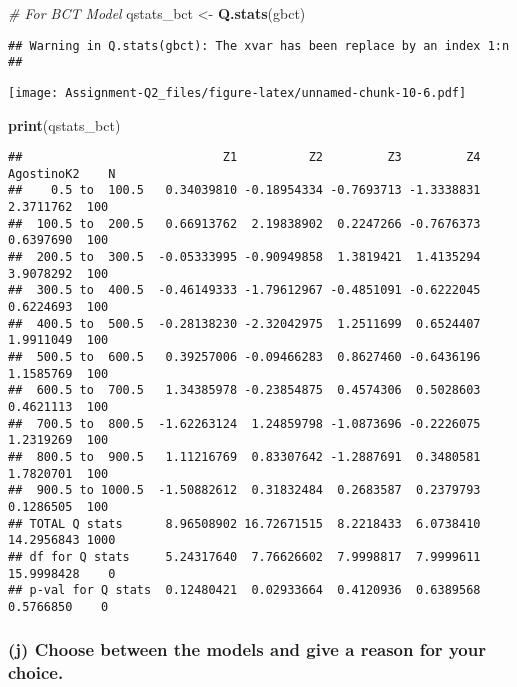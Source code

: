\documentclass[
]{article}
\newenvironment{Shaded}{\begin{snugshade}}{\end{snugshade}}
\newcommand{\CommentTok}[1]{\textcolor[rgb]{0.56,0.35,0.01}{\textit{#1}}}
\newcommand{\FunctionTok}[1]{\textcolor[rgb]{0.13,0.29,0.53}{\textbf{#1}}}
\newcommand{\NormalTok}[1]{#1}
\newcommand{\OtherTok}[1]{\textcolor[rgb]{0.56,0.35,0.01}{#1}}
\begin{document}
\begin{Shaded}
\begin{Highlighting}[]
\CommentTok{\# For BCT Model}
\NormalTok{qstats\_bct }\OtherTok{\textless{}{-}} \FunctionTok{Q.stats}\NormalTok{(gbct)}
\end{Highlighting}
\end{Shaded}

\begin{verbatim}
## Warning in Q.stats(gbct): The xvar has been replace by an index 1:n 
## 
\end{verbatim}

\texttt{[image: Assignment-Q2\_files/figure-latex/unnamed-chunk-10-6.pdf]}

\begin{Shaded}
\begin{Highlighting}[]
\FunctionTok{print}\NormalTok{(qstats\_bct)}
\end{Highlighting}
\end{Shaded}

\begin{verbatim}
##                            Z1          Z2         Z3         Z4 AgostinoK2    N
##    0.5 to  100.5   0.34039810 -0.18954334 -0.7693713 -1.3338831  2.3711762  100
##  100.5 to  200.5   0.66913762  2.19838902  0.2247266 -0.7676373  0.6397690  100
##  200.5 to  300.5  -0.05333995 -0.90949858  1.3819421  1.4135294  3.9078292  100
##  300.5 to  400.5  -0.46149333 -1.79612967 -0.4851091 -0.6222045  0.6224693  100
##  400.5 to  500.5  -0.28138230 -2.32042975  1.2511699  0.6524407  1.9911049  100
##  500.5 to  600.5   0.39257006 -0.09466283  0.8627460 -0.6436196  1.1585769  100
##  600.5 to  700.5   1.34385978 -0.23854875  0.4574306  0.5028603  0.4621113  100
##  700.5 to  800.5  -1.62263124  1.24859798 -1.0873696 -0.2226075  1.2319269  100
##  800.5 to  900.5   1.11216769  0.83307642 -1.2887691  0.3480581  1.7820701  100
##  900.5 to 1000.5  -1.50882612  0.31832484  0.2683587  0.2379793  0.1286505  100
## TOTAL Q stats      8.96508902 16.72671515  8.2218433  6.0738410 14.2956843 1000
## df for Q stats     5.24317640  7.76626602  7.9998817  7.9999611 15.9998428    0
## p-val for Q stats  0.12480421  0.02933664  0.4120936  0.6389568  0.5766850    0
\end{verbatim}

\hypertarget{j-choose-between-the-models-and-give-a-reason-for-your-choice.}{%
\subsubsection{(j) Choose between the models and give a reason for your
choice.}\label{j-choose-between-the-models-and-give-a-reason-for-your-choice.}}
\end{document}
